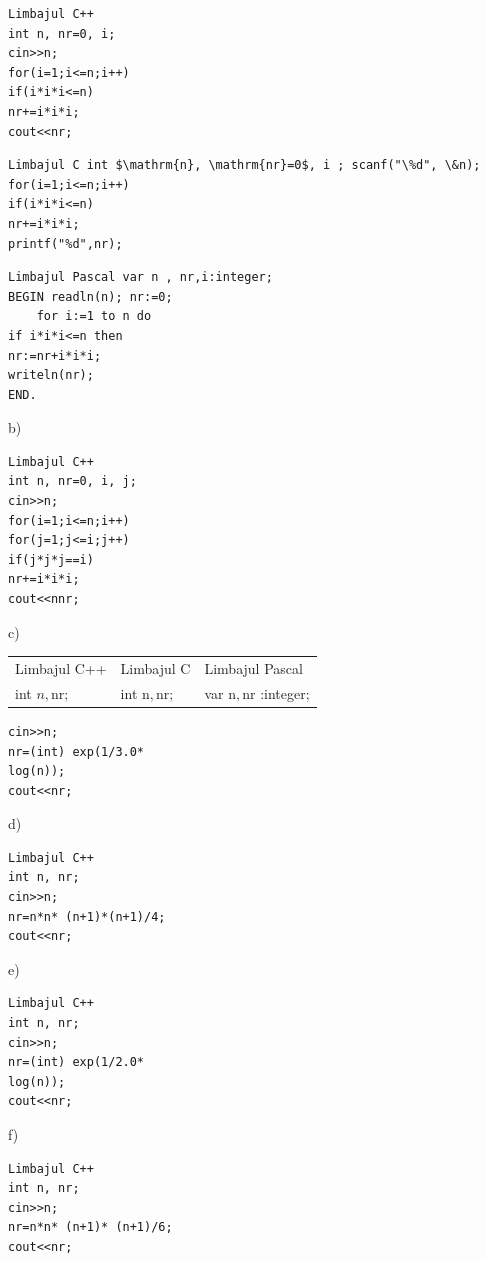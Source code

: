 \documentclass[10pt]{article}
\begin{document}
\begin{verbatim}
Limbajul C++
int n, nr=0, i;
cin>>n;
for(i=1;i<=n;i++)
if(i*i*i<=n)
nr+=i*i*i;
cout<<nr;
\end{verbatim}

\begin{verbatim}
Limbajul C int $\mathrm{n}, \mathrm{nr}=0$, i ; scanf("\%d", \&n);
for(i=1;i<=n;i++)
if(i*i*i<=n)
nr+=i*i*i;
printf("%d",nr);
\end{verbatim}

\begin{verbatim}
Limbajul Pascal var n , nr,i:integer;
BEGIN readln(n); nr:=0;
    for i:=1 to n do
if i*i*i<=n then
nr:=nr+i*i*i;
writeln(nr);
END.
\end{verbatim}

b)

\begin{verbatim}
Limbajul C++
int n, nr=0, i, j;
cin>>n;
for(i=1;i<=n;i++)
for(j=1;j<=i;j++)
if(j*j*j==i)
nr+=i*i*i;
cout<<nnr;
\end{verbatim}

c)

\begin{center}
\begin{tabular}{l|l|l}
Limbajul C++ & Limbajul C & Limbajul Pascal \\
int $n, \mathrm{nr} ;$ & int $\mathrm{n}, \mathrm{nr} ;$ & var $\mathrm{n}, \mathrm{nr}$ :integer; \\
\end{tabular}
\end{center}

\begin{verbatim}
cin>>n;
nr=(int) exp(1/3.0*
log(n));
cout<<nr;
\end{verbatim}

d)

\begin{verbatim}
Limbajul C++
int n, nr;
cin>>n;
nr=n*n* (n+1)*(n+1)/4;
cout<<nr;
\end{verbatim}

e)

\begin{verbatim}
Limbajul C++
int n, nr;
cin>>n;
nr=(int) exp(1/2.0*
log(n));
cout<<nr;
\end{verbatim}

f)

\begin{verbatim}
Limbajul C++
int n, nr;
cin>>n;
nr=n*n* (n+1)* (n+1)/6;
cout<<nr;
\end{verbatim}
\end{document}
